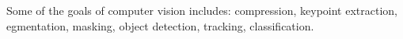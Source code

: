 Some of the goals of computer vision includes: compression, keypoint extraction, egmentation, masking, object detection, tracking, classification. 

